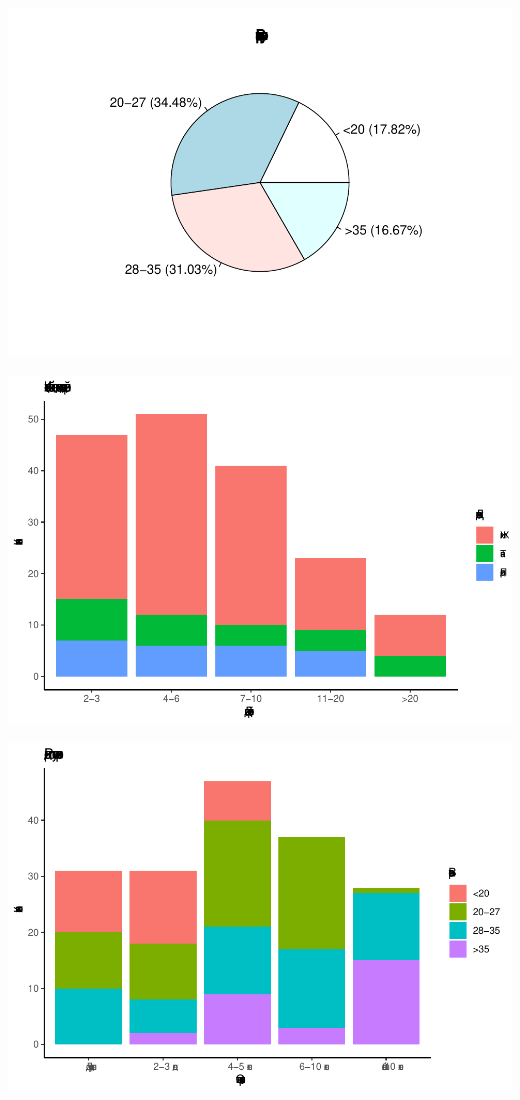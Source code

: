 \documentclass[
]{article}
\begin{document}
\begin{center}\includegraphics[width=0.85\linewidth]{Regression-model-for-estimating-RM_files/figure-latex/unnamed-chunk-8-3} \end{center}

\begin{center}\includegraphics[width=0.85\linewidth]{Regression-model-for-estimating-RM_files/figure-latex/unnamed-chunk-8-4} \end{center}

\begin{center}\includegraphics[width=0.85\linewidth]{Regression-model-for-estimating-RM_files/figure-latex/unnamed-chunk-8-5} \end{center}
\end{document}
